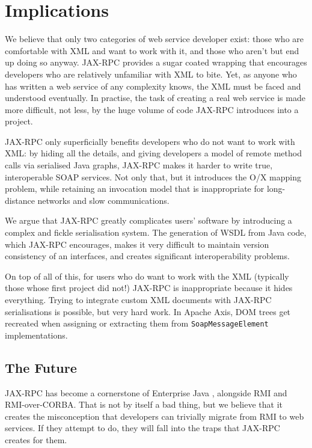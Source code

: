 \section{Implications}
\label{implications}

We believe that only two categories of web service developer exist:
those who are comfortable with XML and want to work with it, and those
who aren't but end up doing so anyway. JAX-RPC provides a sugar coated
wrapping that encourages developers who are relatively unfamiliar with
XML to bite. Yet, as anyone who has written a web service of any
complexity knows, the XML must be faced and understood eventually. In
practise, the task of creating a real web service is made more
difficult, not less, by the huge volume of code JAX-RPC introduces
into a project.

JAX-RPC only superficially benefits developers who do not want to work
with XML: by hiding all the details, and giving developers a model of
remote method calls via serialised Java graphs, JAX-RPC makes it
harder to write true, interoperable SOAP services. Not only that, but
it introduces the O/X mapping problem, while retaining an invocation
model that is inappropriate for long-distance networks and slow
communications.

We argue that JAX-RPC greatly complicates users' software by
introducing a complex and fickle serialisation system. The generation
of WSDL from Java code, which JAX-RPC encourages, makes it very
difficult to maintain version consistency of an interfaces, and
creates significant interoperability problems.

On top of all of this, for users who do want to work with the XML
(typically those whose first project did not!) JAX-RPC is
inappropriate because it hides everything. Trying to integrate custom
XML documents with JAX-RPC serialisations is possible, but very hard
work. In Apache Axis, DOM trees get recreated when assigning or
extracting them from {\tt SoapMessageElement} implementations.


\subsection{The Future}
\label{implications:future}

JAX-RPC has become a cornerstone of Enterprise Java
\cite{spec:J2EE-14}, alongside RMI and RMI-over-CORBA. That is not by
itself a bad thing, but we believe that it creates the misconception
that developers can trivially migrate from RMI to web services. If
they attempt to do, they will fall into the traps that JAX-RPC creates
for them.

